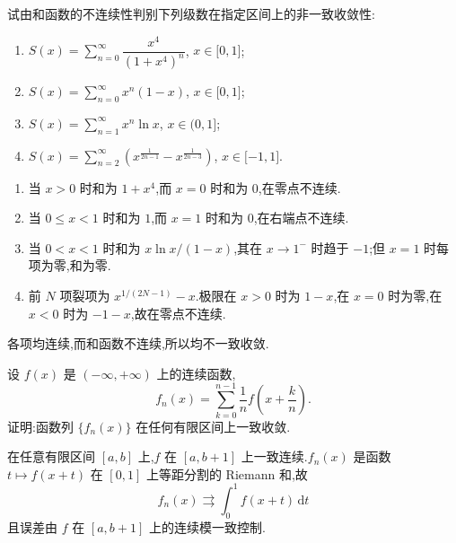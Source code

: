 \begin{example}
    试由和函数的不连续性判别下列级数在指定区间上的非一致收敛性:
    \begin{enumerate}
        \item $\displaystyle S(x)=\sum\limits_{n=0}^{\infty}\dfrac{x^4}{(1+x^4)^n}$, $x\in\lbrack 0,1\rbrack$;
        \item $\displaystyle S(x)=\sum\limits_{n=0}^{\infty}x^n(1-x)$, $x\in\lbrack 0,1\rbrack$;
        \item $\displaystyle S(x)=\sum\limits_{n=1}^{\infty}x^n\ln x$, $x\in(0,1\rbrack$;
        \item $\displaystyle S(x)=\sum\limits_{n=2}^{\infty}\left(x^{\frac{1}{2n-1}}-x^{\frac{1}{2n-3}}\right)$, $x\in\lbrack -1,1\rbrack$.
    \end{enumerate}
\end{example}
\exampleblank

\begin{solution}
    \leavevmode
    \begin{enumerate}
        \item 当 $x>0$ 时和为 $1+x^4$,而 $x=0$ 时和为 $0$,在零点不连续.
        \item 当 $0\leq x<1$ 时和为 $1$,而 $x=1$ 时和为 $0$,在右端点不连续.
        \item 当 $0<x<1$ 时和为 $x\ln x/(1-x)$,其在 $x\to1^-$ 时趋于 $-1$;但 $x=1$ 时每项为零,和为零.
        \item 前 $N$ 项裂项为 $x^{1/(2N-1)}-x$.极限在 $x>0$ 时为 $1-x$,在 $x=0$ 时为零,在 $x<0$ 时为 $-1-x$,故在零点不连续.
    \end{enumerate}
    各项均连续,而和函数不连续,所以均不一致收敛.
\end{solution}

\begin{example}
    设 $f(x)$ 是 $(-\infty,+\infty)$ 上的连续函数,
    \[
        f_n(x)=\sum\limits_{k=0}^{n-1}\dfrac{1}{n}f\left(x+\dfrac{k}{n}\right).
    \]
    证明:函数列 $\{f_n(x)\}$ 在任何有限区间上一致收敛.
\end{example}
\exampleblank

\begin{solution}
    在任意有限区间 $[a,b]$ 上,$f$ 在 $[a,b+1]$ 上一致连续.$f_n(x)$ 是函数
    $t\mapsto f(x+t)$ 在 $[0,1]$ 上等距分割的 Riemann 和,故
    \[
        f_n(x)\rightrightarrows\int_0^1f(x+t)\,\mathrm{d}t
    \]
    且误差由 $f$ 在 $[a,b+1]$ 上的连续模一致控制.
\end{solution}

